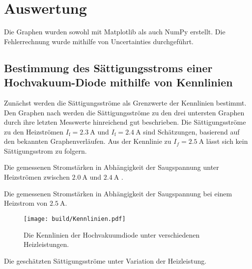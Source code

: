 \section{Auswertung}
\label{sec:Auswertung}

Die Graphen wurden sowohl mit Matplotlib \cite{matplotlib} als auch NumPy \cite{numpy} erstellt. Die
 Fehlerrechnung wurde mithilfe von Uncertainties \cite{uncertainties} durchgeführt.


 \subsection{Bestimmung des Sättigungsstroms einer Hochvakuum-Diode mithilfe von Kennlinien}
Zunächst werden die Sättigungsströme als Grenzwerte der Kennlinien bestimmt. Den Graphen nach werden die
Sättigungsströme zu den drei untersten Graphen durch ihre letzten Messwerte hinreichend
gut beschrieben. Die Sättigungsströme zu den Heizströmen $I_\text{f} = \SI{2.3}{\ampere}$ und $I_\text{f} = \SI{2.4}{\ampere}$
sind Schätzungen, basierend auf den bekannten Graphenverläufen. Aus der Kennlinie
zu $I_f = \SI{2.5}{\ampere}$ lässt sich kein Sättigungsstrom zu folgern.

 \begin{table}
 	\centering
 	\caption{Die gemessenen Stromstärken in Abhängigkeit der Saugspannung unter Heizströmen zwischen $\SI{2,0}{\ampere}$ und $\SI{2,4}{\ampere}$ .}
 	
 \end{table}

 \begin{table}
  \centering
  \caption{Die gemessenen Stromstärken in Abhängigkeit der Saugspannung bei einem Heizstrom von $\SI{2,5}{\ampere}$.}
  
  
 \end{table}

 \begin{figure}
 	\centering
 	\caption{Die Kennlinien der Hochvakuumdiode unter verschiedenen Heizleistungen.}
 	\texttt{[image: build/Kennlinien.pdf]}
 	\label{fig:Graph}
 \end{figure}

 \begin{table}
  \centering
  \caption{Die geschätzten Sättigungsströme unter Variation der Heizleistung.}
  
 \end{table}




